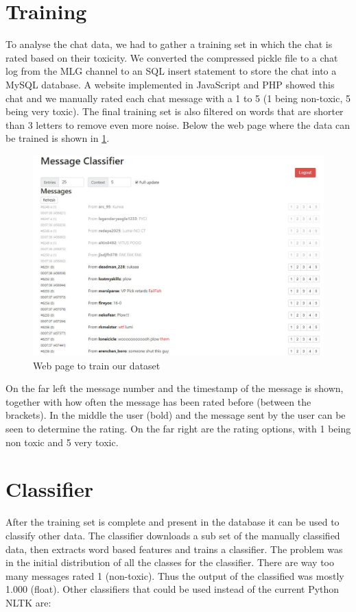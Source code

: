 \documentclass[final]{report}
\begin{document}
\section{Training}
To analyse the chat data, we had to gather a training set in which the chat is rated based on their toxicity.
We converted the compressed pickle file to a chat log from the MLG channel to an SQL insert statement to store the chat into a MySQL database.
A website implemented in JavaScript and PHP showed this chat and we manually rated each chat message with a 1 to 5 (1 being non-toxic, 5 being very toxic). The final training set is also filtered on words that are shorter than 3 letters to remove even more noise. Below the web page where the data can be trained is shown in \ref{fig:rating}.

\begin{figure}[h]
\includegraphics[scale=0.5]{rating}
\caption{Web page to train our dataset}
\label{fig:rating}
\end{figure}

On the far left the message number and the timestamp of the message is shown, together with how often the message has been rated before (between the brackets). In the middle the user (bold) and the message sent by the user can be seen to determine the rating. On the far right are the rating options, with 1 being non toxic and 5 very toxic.

\section{Classifier}

After the training set is complete and present in the database it can be used to classify other data. The classifier downloads a sub set of the manually classified data, then extracts word based features and trains a classifier.
The problem was in the initial distribution of all the classes for the classifier.
There are way too many messages rated 1 (non-toxic). Thus the output of the classified was mostly 1.000 (float). Other classifiers that could be used instead of the current Python NLTK are:
\end{document}
